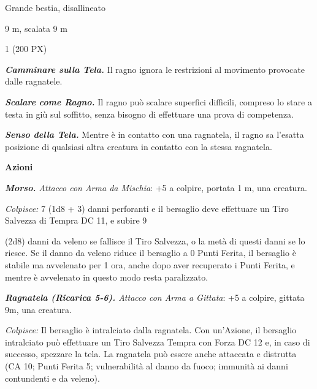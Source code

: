 \begin{multicols}{2}
{
\begin{description}[noitemsep, topsep=0pt, parsep=0pt, partopsep=0pt, itemsep=1pt, leftmargin=2.35cm,  labelwidth=2.2cm, itemindent=0cm, listparindent=0pt] %
\setlength{\baselineskip}{10pt}
\item[\textbf{Taglia/Tipo}] Grande bestia, disallineato
\item[\textbf{Caratt.}] 
\item[\textbf{Punti Ferita}] 
\item[\textbf{Tiri Salvez.}] 
\item[\textbf{Movimento}] 9 m, scalata 9 m
\item[\textbf{Sfida}] 1 (200 PX)
\end{description}
\smallskip

\emph{\textbf{Camminare sulla Tela.}} Il ragno ignora le restrizioni al movimento provocate dalle ragnatele.

\emph{\textbf{Scalare come Ragno.}} Il ragno può scalare superfici difficili, compreso lo stare a testa in giù sul soffitto, senza bisogno di effettuare una prova di competenza.

\emph{\textbf{Senso della Tela.}} Mentre è in contatto con una ragnatela, il ragno sa l'esatta posizione di qualsiasi altra creatura in contatto con la stessa ragnatela.

\textbf{Azioni}

\emph{\textbf{Morso.} Attacco con Arma da Mischia}: +5 a colpire, portata 1 m, una creatura.

\emph{Colpisce:} 7 (1d8 + 3) danni perforanti e il bersaglio deve effettuare un Tiro Salvezza di Tempra DC 11, e subire 9

(2d8) danni da veleno se fallisce il Tiro Salvezza, o la metà di questi danni se lo riesce. Se il danno da veleno riduce il bersaglio a 0 Punti Ferita, il bersaglio è stabile ma avvelenato per 1 ora, anche dopo aver recuperato i Punti Ferita, e mentre è avvelenato in questo modo resta paralizzato.

\emph{\textbf{Ragnatela (Ricarica 5-6).} Attacco con Arma a Gittata}: +5 a colpire, gittata 9m, una creatura.

\emph{Colpisce:} Il bersaglio è intralciato dalla ragnatela. Con un'Azione, il bersaglio intralciato può effettuare un Tiro Salvezza Tempra con Forza DC 12 e, in caso di successo, spezzare la tela. La ragnatela può essere anche attaccata e distrutta (CA 10; Punti Ferita 5; vulnerabilità al danno da fuoco; immunità ai danni contundenti e da veleno).

}
\end{multicols}

